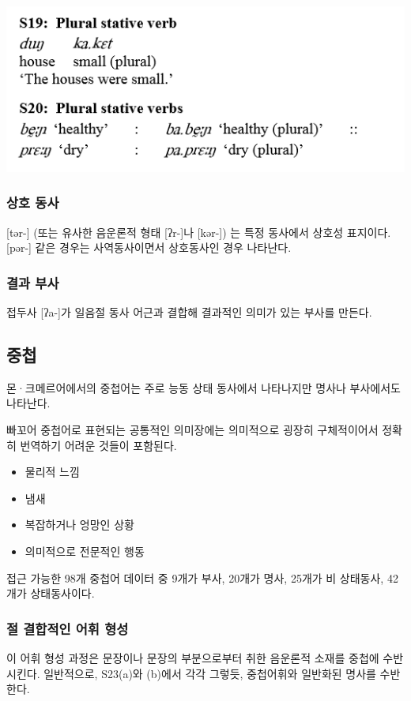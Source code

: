 \includegraphics{Pacoh/src/PacohS19.png}

\subsubsection{상호 동사}
[tər-] (또는 유사한 음운론적 형태 [ʔr-]나 [kər-]) 는 특정 동사에서 상호성 표지이다. [pər-] 같은 경우는 사역동사이면서 상호동사인 경우 나타난다.

\subsubsection{결과 부사}
접두사 [ʔa-]가 일음절 동사 어근과 결합해 결과적인 의미가 있는 부사를 만든다.

\subsection{중첩}
몬·크메르어에서의 중첩어는 주로 능동 상태 동사에서 나타나지만 명사나 부사에서도 나타난다. 

빠꼬어 중첩어로 표현되는 공통적인 의미장에는 의미적으로 굉장히 구체적이어서 정확히 번역하기 어려운 것들이 포함된다.
\begin{itemize}
\item 물리적 느낌
\item 냄새
\item 복잡하거나 엉망인 상황
\item 의미적으로 전문적인 행동
\end{itemize}

접근 가능한 98개 중첩어 데이터 중 9개가 부사, 20개가 명사, 25개가 비 상태동사, 42개가 상태동사이다.

\subsubsection{절 결합적인 어휘 형성}
이 어휘 형성 과정은 문장이나 문장의 부분으로부터 취한 음운론적 소재를 중첩에 수반시킨다. 일반적으로, S23(a)와 (b)에서 각각 그렇듯, 중첩어휘와 일반화된 명사를 수반한다.

